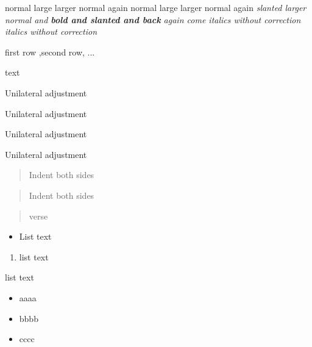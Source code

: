 \documentclass[12pt,twoside,a4paper]{article}   %
\begin{document}
	normal {\large large \Large larger} normal again
	normal large larger normal again
	\sl slanted {\Large larger}
	\setlength{\baselineskip}{15pt}
	\renewcommand{\baselinestretch}{1.5} %
	normal and \textbf{bold and \textsl{slanted} and back} again
	\textit {come italics\nocorr} without correction {\slshape italics \nocorr\textup{without} correction}
	   
	{\tt{}}
	\newpage
	\begin{center}
	 first row ,second row, ...
	\end{center}
	\centering
	\centerline{text}
	\begin{flushleft}
		Unilateral adjustment
	\end{flushleft}
	\begin{flushright}
		Unilateral adjustment
	\end{flushright}
	\raggedleft Unilateral adjustment\\
	\raggedright Unilateral adjustment\\
	\begin{quote}
		Indent both sides
	\end{quote}
	\begin{quotation}
		Indent both sides
	\end{quotation}
	\begin{verse}
		verse
	\end{verse}
	\begin{itemize}	
		\item List text
	\end{itemize}
	\begin{enumerate}
		\item list text
	\end{enumerate}
	\begin{description}
		\item list text
	\end{description}
	\begin{itemize}
	\item aaaa
	\item bbbb
	\item cccc
	\end{itemize}
\end{document}
